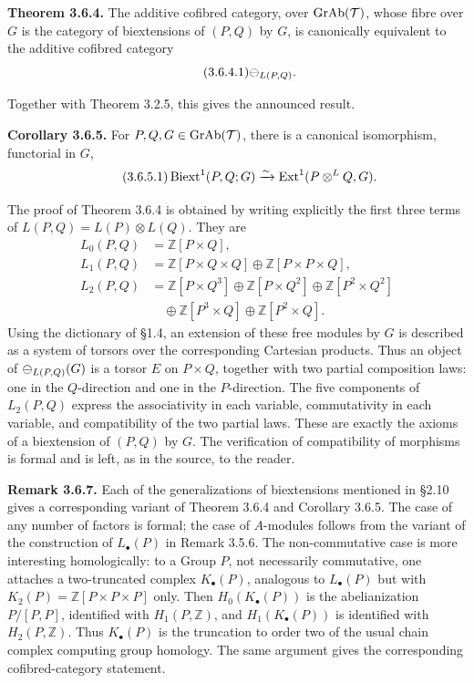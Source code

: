 \documentclass[11pt]{article}
\providecommand{\Z}{\mathbb Z}
\providecommand{\Ext}{\operatorname{Ext}}
\begin{document}
\textbf{Theorem 3.6.4.}  The additive cofibred category, over \(\operatorname{GrAb}(\mathcal T)\), whose fibre over \(G\) is the category of biextensions of \((P,Q)\) by \(G\), is canonically equivalent to the additive cofibred category
\begin{equation}\tag{3.6.4.1}
  \mathcal\Psi_{L(P,Q)}.
\end{equation}

Together with Theorem 3.2.5, this gives the announced result.

\textbf{Corollary 3.6.5.}  For \(P,Q,G\in\operatorname{GrAb}(\mathcal T)\), there is a canonical isomorphism, functorial in \(G\),
\begin{equation}\tag{3.6.5.1}
  \Biext^1(P,Q;G)\xrightarrow{\sim}\Ext^1(P\otimes^{L}Q,G).
\end{equation}

The proof of Theorem 3.6.4 is obtained by writing explicitly the first three terms of \(L(P,Q)=L(P)\otimes L(Q)\).  They are
\begin{align}\tag{3.6.6}
L_0(P,Q)&=\Z[P\times Q],\\
L_1(P,Q)&=\Z[P\times Q\times Q]\oplus\Z[P\times P\times Q],\\
L_2(P,Q)&=\Z[P\times Q^3]\oplus\Z[P\times Q^2]\oplus\Z[P^2\times Q^2]\\
&\quad\oplus\Z[P^3\times Q]\oplus\Z[P^2\times Q].
\end{align}
Using the dictionary of \S1.4, an extension of these free modules by \(G\) is described as a system of torsors over the corresponding Cartesian products.  Thus an object of \(\mathcal\Psi_{L(P,Q)}(G)\) is a torsor \(E\) on \(P\times Q\), together with two partial composition laws: one in the \(Q\)-direction and one in the \(P\)-direction.  The five components of \(L_2(P,Q)\) express the associativity in each variable, commutativity in each variable, and compatibility of the two partial laws.  These are exactly the axioms of a biextension of \((P,Q)\) by \(G\).  The verification of compatibility of morphisms is formal and is left, as in the source, to the reader.

\textbf{Remark 3.6.7.}  Each of the generalizations of biextensions mentioned in \S2.10 gives a corresponding variant of Theorem 3.6.4 and Corollary 3.6.5.  The case of any number of factors is formal; the case of \(A\)-modules follows from the variant of the construction of \(L_\bullet(P)\) in Remark 3.5.6.  The non-commutative case is more interesting homologically: to a Group \(P\), not necessarily commutative, one attaches a two-truncated complex \(K_\bullet(P)\), analogous to \(L_\bullet(P)\) but with \(K_2(P)=\Z[P\times P\times P]\) only.  Then \(H_0(K_\bullet(P))\) is the abelianization \(P/[P,P]\), identified with \(H_1(P,\Z)\), and \(H_1(K_\bullet(P))\) is identified with \(H_2(P,\Z)\).  Thus \(K_\bullet(P)\) is the truncation to order two of the usual chain complex computing group homology.  The same argument gives the corresponding cofibred-category statement.
\end{document}
